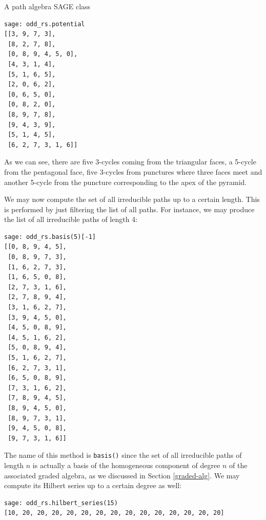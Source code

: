 \begin{chapter}{A path algebra SAGE class}
\begin{figure}[h]
\end{figure}
\begin{lstlisting}
sage: odd_rs.potential
[[3, 9, 7, 3],
 [8, 2, 7, 8],
 [0, 8, 9, 4, 5, 0],
 [4, 3, 1, 4],
 [5, 1, 6, 5],
 [2, 0, 6, 2],
 [0, 6, 5, 0],
 [0, 8, 2, 0],
 [8, 9, 7, 8],
 [9, 4, 3, 9],
 [5, 1, 4, 5],
 [6, 2, 7, 3, 1, 6]]
\end{lstlisting}
As we can see, there are five 3-cycles coming from the triangular faces, a 5-cycle from the pentagonal face, five 3-cycles from punctures where three faces meet and another 5-cycle from the puncture corresponding to the apex of the pyramid.

We may now compute the set of all irreducible paths up to a certain length. This is performed by just filtering the list of all paths. For instance, we may produce the list of all irreducible paths of length 4:
\begin{lstlisting}
sage: odd_rs.basis(5)[-1]
[[0, 8, 9, 4, 5],
 [0, 8, 9, 7, 3],
 [1, 6, 2, 7, 3],
 [1, 6, 5, 0, 8],
 [2, 7, 3, 1, 6],
 [2, 7, 8, 9, 4],
 [3, 1, 6, 2, 7],
 [3, 9, 4, 5, 0],
 [4, 5, 0, 8, 9],
 [4, 5, 1, 6, 2],
 [5, 0, 8, 9, 4],
 [5, 1, 6, 2, 7],
 [6, 2, 7, 3, 1],
 [6, 5, 0, 8, 9],
 [7, 3, 1, 6, 2],
 [7, 8, 9, 4, 5],
 [8, 9, 4, 5, 0],
 [8, 9, 7, 3, 1],
 [9, 4, 5, 0, 8],
 [9, 7, 3, 1, 6]]
\end{lstlisting}
The name of this method is \texttt{basis()} since the set of all irreducible paths of length $n$ is actually a basis of the homogeneous component of degree $n$ of the associated graded algebra, as we discussed in Section \ref{graded-alg}. We may compute its Hilbert series up to a certain degree as well:
\begin{lstlisting}
sage: odd_rs.hilbert_series(15)
[10, 20, 20, 20, 20, 20, 20, 20, 20, 20, 20, 20, 20, 20, 20]
\end{lstlisting}
\end{chapter}